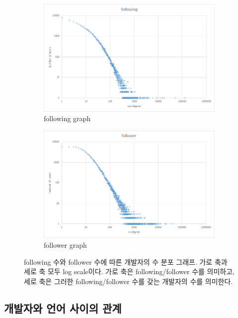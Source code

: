 \documentclass[10pt, a4paper, titlepage]{article}
\begin{document}
\begin{figure}
	\begin{subfigure}{0.99\textwidth}
		\includegraphics[width=\textwidth]{image09}
		\caption{following graph}
	\end{subfigure}

	\begin{subfigure}{0.99\textwidth}
		\includegraphics[width=\textwidth]{image13}
		\caption{follower graph}
	\end{subfigure}

	\caption{following 수와 follower 수에 따른 개발자의 수 분포 그래프. 가로 축과 세로 축 모두 log scale이다. 가로 축은 following/follower 수를 의미하고, 세로 축은 그러한 following/follower 수를 갖는 개발자의 수를 의미한다.}
	\label{fig:fdist}
\end{figure}

\FloatBarrier

\subsection{개발자와 언어 사이의 관계}
\end{document}
